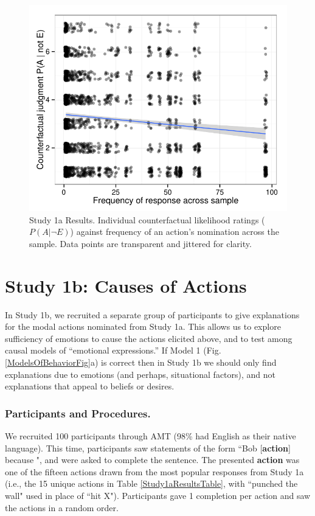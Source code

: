 \documentclass[10pt,letterpaper]{article}
\begin{document}
\begin{figure}[htb!]
\begin{center}
	\includegraphics[width=1\columnwidth]{images/study1a_results.pdf}
\end{center}
\caption{ Study 1a Results. Individual counterfactual likelihood ratings ($P(A | \neg E)$) against frequency of an action's nomination across the sample. Data points are transparent and jittered for clarity. }
\label{Study1aResultsFig}
\end{figure}


\section{Study 1b: Causes of Actions}

In Study 1b, we recruited a separate group of participants to give explanations for the modal actions nominated from Study 1a. 
This allows us to explore sufficiency of emotions to cause the actions elicited above, and to test among causal models of ``emotional expressions.''
If Model 1 (Fig. \ref{ModelsOfBehaviorFig}a) is correct then in Study 1b we should only find explanations due to emotions (and perhaps, situational factors), and not explanations that appeal to beliefs or desires.


\subsubsection{Participants and Procedures.} 
We recruited 100 participants through AMT (98\% had English as their native language). This time, participants saw statements of the form ``Bob [\textbf{action}] because \underline{\hspace{3em}}", and were asked to complete the sentence. The presented \textbf{action} was one of the fifteen actions drawn from the most popular responses from Study 1a (i.e., the 15 unique actions in Table \ref{Study1aResultsTable}, with ``punched the wall" used in place of ``hit X"). Participants gave 1 completion per action and saw the actions in a random order.
\end{document}
